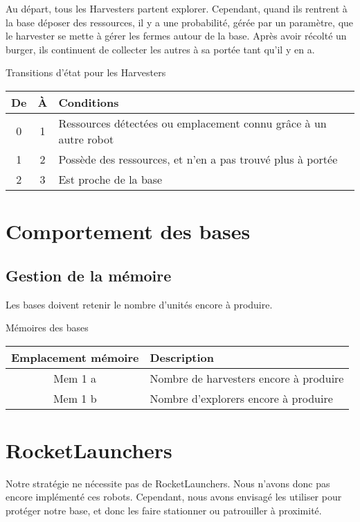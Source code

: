 \documentclass{article}
\begin{document}
Au départ, tous les Harvesters partent explorer.
Cependant, quand ils rentrent à la base déposer des ressources, il y a une probabilité, gérée par un paramètre, que le harvester se mette à gérer les fermes autour de la base.
Après avoir récolté un burger, ils continuent de collecter les autres à sa portée tant qu'il y en a.
\newline

\begin{table}[!htb]
	Transitions d'état pour les Harvesters\\
	\begin{tabular}{|c|c|l|}
		\hline
		De & À & Conditions\\
		\hline
		0 & 1 & Ressources détectées ou emplacement connu grâce à un autre robot\\
		\hline
		1 & 2 & Possède des ressources, et n'en a pas trouvé plus à portée\\
		\hline
		2 & 3 & Est proche de la base\\
		\hline
	\end{tabular}
\end{table}

\section{Comportement des bases}

\subsection{Gestion de la mémoire}

Les bases doivent retenir le nombre d'unités encore à produire.
\begin{table}[!htb]
	Mémoires des bases\\
	\begin{tabular}{|c|l|}
		\hline
		Emplacement mémoire & Description\\
		\hline
		Mem 1 a & Nombre de harvesters encore à produire\\
		Mem 1 b & Nombre d'explorers encore à produire\\
		\hline
	\end{tabular}
\end{table}

\section{RocketLaunchers}

Notre stratégie ne nécessite pas de RocketLaunchers.
Nous n'avons donc pas encore implémenté ces robots.
Cependant, nous avons envisagé les utiliser pour protéger notre base, et donc les faire stationner ou patrouiller à proximité.
\end{document}
